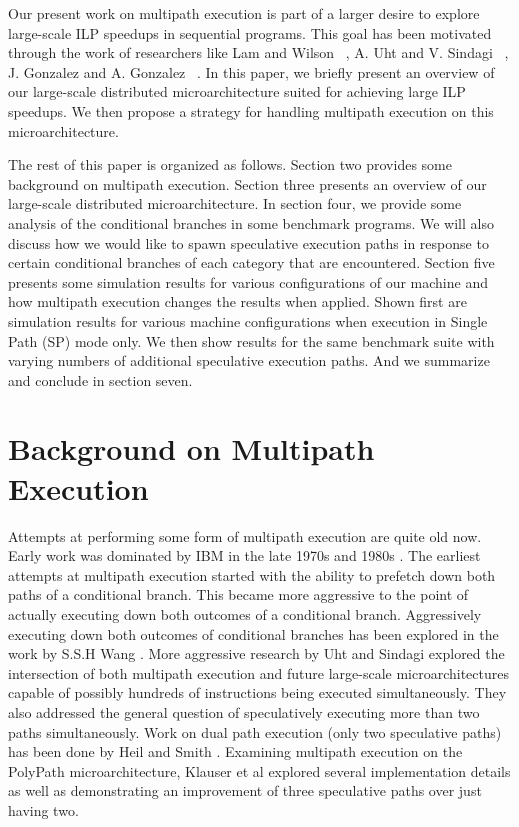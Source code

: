 \documentclass[10pt,dvips]{article}
\begin{document}
Our present work on multipath execution is part of a larger
desire to explore large-scale ILP speedups in sequential programs.
This goal has been motivated through the work of researchers like
Lam and Wilson
~\cite{Lam92},
A. Uht and V. Sindagi ~\cite{Uht95},
J. Gonzalez and A. Gonzalez ~\cite{Gon97}.
In this paper, we briefly present an overview of our large-scale distributed
microarchitecture suited for achieving large ILP speedups.  
We then propose a strategy for handling
multipath execution on this microarchitecture.

The rest of this paper is organized as follows.
Section two provides some background on multipath execution.
Section three presents an overview of our large-scale distributed
microarchitecture.
In section four, we provide some analysis of the conditional
branches in some benchmark programs.  We will also discuss how we
would like to 
spawn speculative execution paths
in response to certain conditional branches of each category that 
are encountered.
Section five presents some simulation results for various
configurations of our machine and how multipath execution
changes the results when applied.  Shown first are simulation
results for various machine configurations when execution in
Single Path (SP) mode only.  We then show results for
the same benchmark suite with varying numbers of additional
speculative execution paths.
And we summarize and conclude in section seven.
%
\section{Background on Multipath Execution}
%
Attempts at performing some form of multipath execution 
are quite old now.  Early work was dominated by IBM in the
late 1970s and 1980s \cite{Conners79}.
The earliest attempts at multipath
execution started with the ability to prefetch down both
paths of a conditional branch.  This became more aggressive
to the point of actually executing down both outcomes of
a conditional branch.  Aggressively executing down both outcomes
of conditional branches has been explored in the work
by S.S.H Wang \cite{Wang90}.  
More aggressive research by Uht and
Sindagi \cite{Uht95} explored the intersection of both
multipath execution and future large-scale microarchitectures
capable of possibly hundreds of instructions being executed simultaneously.
They also addressed the general question of speculatively executing
more than two paths simultaneously.
Work on dual path execution (only two speculative paths) has
been done by Heil and Smith \cite{Heil96}.
Examining multipath execution on the PolyPath microarchitecture,
Klauser et al explored several implementation details
as well as demonstrating an improvement of three speculative paths
over just having two.
\end{document}
